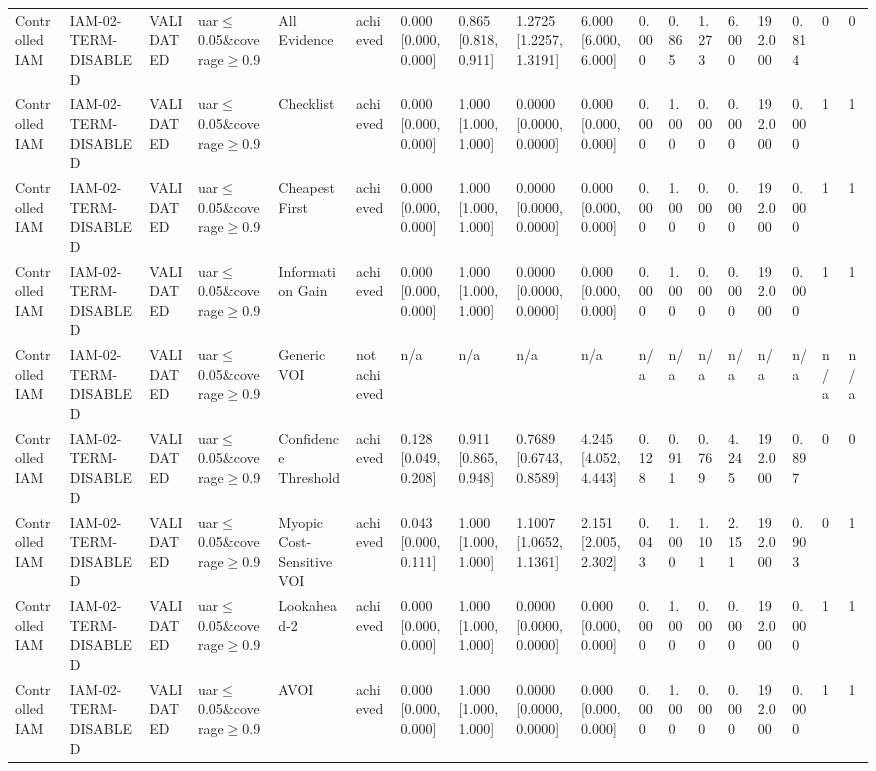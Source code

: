 \begin{table}[!ht]
{\begin{tabular}{llllllllllllllllll}
Controlled IAM & IAM-02-TERM-DISABLED & VALIDATED & uar$\le$0.05\&coverage$\ge$0.9 & All Evidence & achieved & 0.000 [0.000, 0.000] & 0.865 [0.818, 0.911] & 1.2725 [1.2257, 1.3191] & 6.000 [6.000, 6.000] & 0.000 & 0.865 & 1.273 & 6.000 & 192.000 & 0.814 & 0 & 0 \\
Controlled IAM & IAM-02-TERM-DISABLED & VALIDATED & uar$\le$0.05\&coverage$\ge$0.9 & Checklist & achieved & 0.000 [0.000, 0.000] & 1.000 [1.000, 1.000] & 0.0000 [0.0000, 0.0000] & 0.000 [0.000, 0.000] & 0.000 & 1.000 & 0.000 & 0.000 & 192.000 & 0.000 & 1 & 1 \\
Controlled IAM & IAM-02-TERM-DISABLED & VALIDATED & uar$\le$0.05\&coverage$\ge$0.9 & Cheapest First & achieved & 0.000 [0.000, 0.000] & 1.000 [1.000, 1.000] & 0.0000 [0.0000, 0.0000] & 0.000 [0.000, 0.000] & 0.000 & 1.000 & 0.000 & 0.000 & 192.000 & 0.000 & 1 & 1 \\
Controlled IAM & IAM-02-TERM-DISABLED & VALIDATED & uar$\le$0.05\&coverage$\ge$0.9 & Information Gain & achieved & 0.000 [0.000, 0.000] & 1.000 [1.000, 1.000] & 0.0000 [0.0000, 0.0000] & 0.000 [0.000, 0.000] & 0.000 & 1.000 & 0.000 & 0.000 & 192.000 & 0.000 & 1 & 1 \\
Controlled IAM & IAM-02-TERM-DISABLED & VALIDATED & uar$\le$0.05\&coverage$\ge$0.9 & Generic VOI & not achieved & n/a & n/a & n/a & n/a & n/a & n/a & n/a & n/a & n/a & n/a & n/a & n/a \\
Controlled IAM & IAM-02-TERM-DISABLED & VALIDATED & uar$\le$0.05\&coverage$\ge$0.9 & Confidence Threshold & achieved & 0.128 [0.049, 0.208] & 0.911 [0.865, 0.948] & 0.7689 [0.6743, 0.8589] & 4.245 [4.052, 4.443] & 0.128 & 0.911 & 0.769 & 4.245 & 192.000 & 0.897 & 0 & 0 \\
Controlled IAM & IAM-02-TERM-DISABLED & VALIDATED & uar$\le$0.05\&coverage$\ge$0.9 & Myopic Cost-Sensitive VOI & achieved & 0.043 [0.000, 0.111] & 1.000 [1.000, 1.000] & 1.1007 [1.0652, 1.1361] & 2.151 [2.005, 2.302] & 0.043 & 1.000 & 1.101 & 2.151 & 192.000 & 0.903 & 0 & 1 \\
Controlled IAM & IAM-02-TERM-DISABLED & VALIDATED & uar$\le$0.05\&coverage$\ge$0.9 & Lookahead-2 & achieved & 0.000 [0.000, 0.000] & 1.000 [1.000, 1.000] & 0.0000 [0.0000, 0.0000] & 0.000 [0.000, 0.000] & 0.000 & 1.000 & 0.000 & 0.000 & 192.000 & 0.000 & 1 & 1 \\
Controlled IAM & IAM-02-TERM-DISABLED & VALIDATED & uar$\le$0.05\&coverage$\ge$0.9 & AVOI & achieved & 0.000 [0.000, 0.000] & 1.000 [1.000, 1.000] & 0.0000 [0.0000, 0.0000] & 0.000 [0.000, 0.000] & 0.000 & 1.000 & 0.000 & 0.000 & 192.000 & 0.000 & 1 & 1 \\

\end{tabular}}
\end{table}
